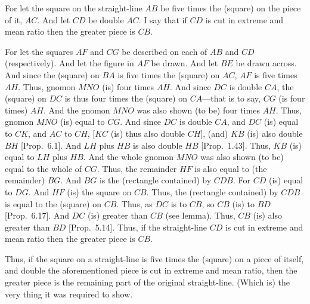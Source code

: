 \begin{Parallel}{}{}
{\epsfysize=2.5in
\centerline{}

For let the square on the straight-line $AB$ be five times the (square)
on the piece of it, $AC$. And let $CD$ be double $AC$. I say that
if $CD$ is cut in extreme and mean ratio then the greater piece
is $CB$. 

For let the squares $AF$ and $CG$ be described on each of
$AB$ and $CD$ (respectively). And let the figure  in $AF$ be drawn.
And let $BE$ be drawn across. And since the (square) on $BA$
is five times the (square) on $AC$, $AF$ is five times $AH$. 
Thus, gnomon $MNO$ (is) four times $AH$. 
And since
$DC$ is double $CA$, the (square) on $DC$ is thus four times the (square)
on $CA$---that is to say, $CG$ (is four times) $AH$. And the gnomon
$MNO$ was also shown (to be) four times $AH$. Thus, gnomon $MNO$
(is) equal to $CG$. And since $DC$ is double $CA$, and $DC$
(is) equal to $CK$, and $AC$ to $CH$, [$KC$ (is) thus also double $CH$], (and) $KB$ (is) also double $BH$
[Prop.~6.1]. And $LH$ plus $HB$ is also double $HB$ [Prop.~1.43].
Thus, $KB$ (is) equal to $LH$ plus $HB$. And the whole gnomon
$MNO$ was also shown (to be) equal to the whole of $CG$. Thus, the
remainder $HF$ is also equal to (the remainder) $BG$.  And $BG$
is the (rectangle contained) by $CDB$. For  $CD$ (is) equal to $DG$.
And $HF$ (is) the square on $CB$. Thus, the (rectangle contained)
by $CDB$ is equal to the (square) on $CB$. Thus, as $DC$ is to $CB$,
so $CB$ (is) to $BD$ [Prop.~6.17]. And $DC$ (is) greater than $CB$ (see lemma). Thus, $CB$ (is) also greater than $BD$ [Prop.~5.14]. Thus, if the
straight-line $CD$ is cut in extreme and mean ratio then the greater piece is $CB$.

Thus, if the square on a straight-line is five times the (square) on a piece of
itself, and  double the aforementioned piece is cut in extreme and
mean ratio, then the greater piece is the remaining part of the
original straight-line.  (Which is) the very thing it was required to show.}
\end{Parallel}

